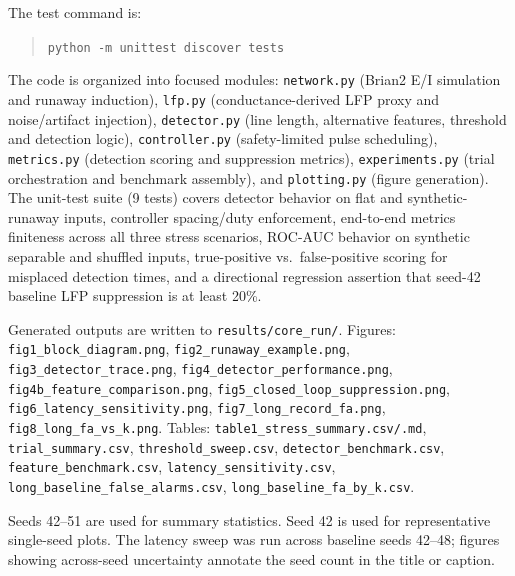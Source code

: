 \documentclass[12pt]{article}
\begin{document}
The test command is:
\begin{quote}
\small\texttt{python -m unittest discover tests}
\end{quote}

The code is organized into focused modules: \texttt{network.py} (Brian2 E/I simulation and runaway induction), \texttt{lfp.py} (conductance-derived LFP proxy and noise/artifact injection), \texttt{detector.py} (line length, alternative features, threshold and detection logic), \texttt{controller.py} (safety-limited pulse scheduling), \texttt{metrics.py} (detection scoring and suppression metrics), \texttt{experiments.py} (trial orchestration and benchmark assembly), and \texttt{plotting.py} (figure generation). The unit-test suite (9 tests) covers detector behavior on flat and synthetic-runaway inputs, controller spacing/duty enforcement, end-to-end metrics finiteness across all three stress scenarios, ROC-AUC behavior on synthetic separable and shuffled inputs, true-positive vs.\ false-positive scoring for misplaced detection times, and a directional regression assertion that seed-42 baseline LFP suppression is at least 20\%.

Generated outputs are written to \texttt{results/core\_run/}. Figures: \texttt{fig1\_block\_diagram.png}, \texttt{fig2\_runaway\_example.png}, \texttt{fig3\_detector\_trace.png}, \texttt{fig4\_detector\_performance.png}, \texttt{fig4b\_feature\_comparison.png}, \texttt{fig5\_closed\_loop\_suppression.png}, \texttt{fig6\_latency\_sensitivity.png}, \texttt{fig7\_long\_record\_fa.png}, \texttt{fig8\_long\_fa\_vs\_k.png}. Tables: \texttt{table1\_stress\_summary.csv/.md}, \texttt{trial\_summary.csv}, \texttt{threshold\_sweep.csv}, \texttt{detector\_benchmark.csv}, \texttt{feature\_benchmark.csv}, \texttt{latency\_sensitivity.csv}, \texttt{long\_baseline\_false\_alarms.csv}, \texttt{long\_baseline\_fa\_by\_k.csv}.

Seeds 42--51 are used for summary statistics. Seed 42 is used for representative single-seed plots. The latency sweep was run across baseline seeds 42--48; figures showing across-seed uncertainty annotate the seed count in the title or caption.

\clearpage
\end{document}
